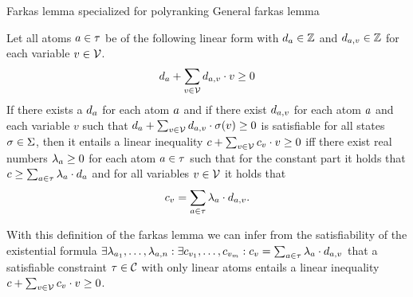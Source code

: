 Farkas lemma specialized for polyranking \cite{bradley2005polyranking}
General farkas lemma \cite{schrijver1998theory}
\begin{definition}
  Let all atoms $a \in \tau$ be of the following linear form with $d_a \in \mathbb{Z}$ and $d_{a,v} \in \mathbb{Z}$ for each variable $v \in \mathcal{V}$.
  \[ d_a + \sum_{v \in \mathcal{V}} d_{a,v} \cdot v \geq 0 \]
  If there exists a $d_a$ for each atom $a$ and if there exist $d_{a,v}$ for each atom $a$ and each variable $v$ such that $d_a + \sum_{v \in \mathcal{V}} d_{a,v} \cdot \sigma(v) \geq 0$ is satisfiable for all states $\sigma \in \Sigma$, then it entails a linear inequality $c + \sum_{v \in \mathcal{V}} c_v \cdot v \geq 0$ iff there exist real numbers $\lambda_a \geq 0$ for each atom $a \in \tau$ such that for the constant part it holds that $c \geq \sum_{a \in \tau} \lambda_a \cdot d_a$ and for all variables $v \in \mathcal{V}$ it holds that
  \[ c_v = \sum_{a \in \tau} \lambda_a \cdot d_{a,v}. \]
\end{definition}
With this definition of the farkas lemma we can infer from the satisfiability of the existential formula $\exists \lambda_{a_1}, \dots, \lambda_{a,n}: \exists c_{v_1}, \dots, c_{v_m}: c_v = \sum_{a \in \tau} \lambda_a \cdot d_{a,v}$ that a satisfiable constraint $\tau \in \mathcal{C}$ with only linear atoms entails a linear inequality $c + \sum_{v \in \mathcal{V}} c_v \cdot v \geq 0$.
